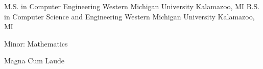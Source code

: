 

\begin{cventries}

  \cventry
    {M.S. in Computer Engineering} %
    {Western Michigan University} %
    {Kalamazoo, MI} %
  \cventry
    {B.S. in Computer Science and Engineering} %
    {Western Michigan University} %
    {Kalamazoo, MI} %
    {
      \begin{cvitems} %
        \item {Minor: Mathematics}
        \item {Magna Cum Laude}
      \end{cvitems}
    }


\end{cventries}
